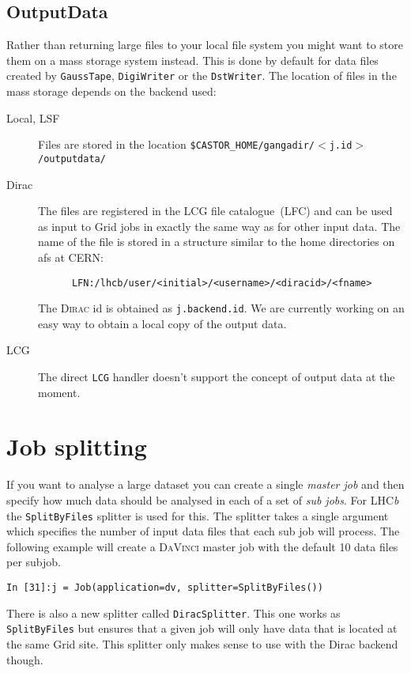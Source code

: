 \documentclass{howto}
\def\lhcb {LHC{\em b\/}\xspace}
\def\davinci {\textsc{DaVinci}\xspace}
\def\dirac {\textsc{Dirac}\xspace}
\begin{document}
\subsection{OutputData}
\label{sec:OutputData}
Rather than returning large files to your local file system you might want to
store them on a mass storage system instead. This is done by default for data
files created by \texttt{GaussTape}, \texttt{DigiWriter} or the
\texttt{DstWriter}. The location of files in the mass storage depends on the
backend used:
\begin{description}
\item[Local, LSF] Files are stored in the location
  \texttt{\$CASTOR_HOME/gangadir/$<$j.id$>$/outputdata/}
\item[Dirac] The files are registered in the LCG file catalogue~(LFC) and can
  be used as input to Grid jobs in exactly the same way as for other input
  data. The name of the file is stored in a structure similar to the home
  directories on afs at CERN:
\begin{verbatim}
      LFN:/lhcb/user/<initial>/<username>/<diracid>/<fname> 
\end{verbatim}
  The \dirac id is obtained as \texttt{j.backend.id}. We are currently working
  on an easy way to obtain a local copy of the output data.
\item[LCG] The direct \texttt{LCG} handler doesn't support the concept of
  output data at the moment.
\end{description}


\section{Job splitting}
\label{sec:splitting}
If you want to analyse a large dataset you can create a single \emph{master
  job} and then specify how much data should be analysed in each of a set of
\emph{sub jobs}. For \lhcb the \texttt{SplitByFiles} splitter is used for
this. The splitter takes a single argument which specifies the number of input
data files that each sub job will process. The following example will create a
\davinci master job with the default 10 data files per subjob.
\begin{verbatim}
In [31]:j = Job(application=dv, splitter=SplitByFiles())
\end{verbatim}

There is also a new splitter called \texttt{DiracSplitter}. This one works as
\texttt{SplitByFiles} but ensures that a given job will only have data that is
located at the same Grid site. This splitter only makes sense to use with the
Dirac backend though.
\end{document}
